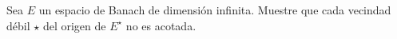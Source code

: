  Sea $E$ un espacio de Banach de dimensión infinita. Muestre que cada vecindad débil $\star$ del origen de $E^{\star}$ no es acotada.